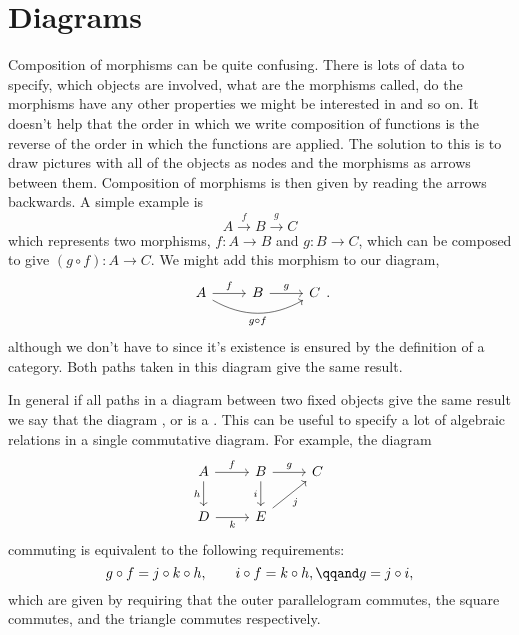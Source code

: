 \documentclass[fleqn]{NotesClass}
\begin{document}
    \section{Diagrams}
    Composition of morphisms can be quite confusing.
    There is lots of data to specify, which objects are involved, what are the morphisms called, do the morphisms have any other properties we might be interested in and so on.
    It doesn't help that the order in which we write composition of functions is the reverse of the order in which the functions are applied.
    The solution to this is to draw pictures with all of the objects as nodes and the morphisms as arrows between them.
    Composition of morphisms is then given by reading the arrows backwards.
    A simple example is
    \begin{equation}
        A \xrightarrow{f} B \xrightarrow{g} C
    \end{equation}
    which represents two morphisms, \(f \colon A \to B\) and \(g \colon B \to C\), which can be composed to give \((g \circ f) \colon A \to C\).
    We might add this morphism to our diagram,
    \begin{equation}
        \begin{tikzcd}
            A \arrow[r, "f"] \arrow[rr, bend right, "g \circ f"'] & B \arrow[r, "g"] & C
        \end{tikzcd}
        .
    \end{equation}
    although we don't have to since it's existence is ensured by the definition of a category.
    Both paths taken in this diagram give the same result.
    
    In general if all paths in a diagram between two fixed objects give the same result we say that the diagram , or is a .
    This can be useful to specify a lot of algebraic relations in a single commutative diagram.
    For example, the diagram
    \begin{equation}
        \begin{tikzcd}
            A \arrow[r, "f"] \arrow[d, "h"'] & B \arrow[r, "g"] \arrow[d, "i"'] & C\\
            D \arrow[r, "k"'] & E \arrow[ur, "j"']
        \end{tikzcd}
    \end{equation}
    commuting is equivalent to the following requirements:
    \begin{equation}
        g \circ f = j \circ k \circ h, \qquad i \circ f = k \circ h, \qqand g = j \circ i,
    \end{equation}
    which are given by requiring that the outer parallelogram commutes, the square commutes, and the triangle commutes respectively.
    
\end{document}
